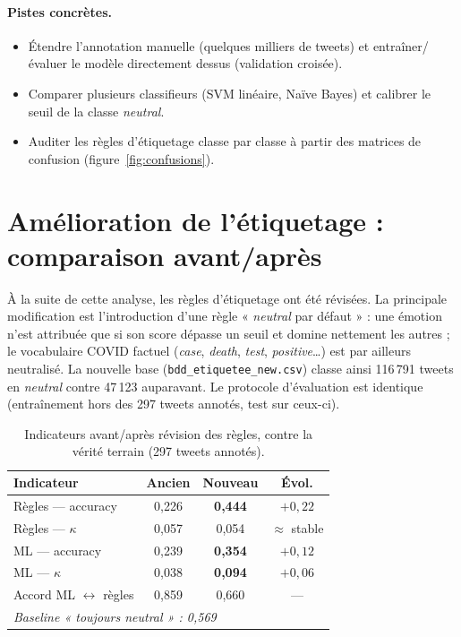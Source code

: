 \documentclass[11pt,a4paper]{article}
\begin{document}
\paragraph{Pistes concrètes.}
\begin{itemize}
  \item Étendre l'annotation manuelle (quelques milliers de tweets) et
        entraîner/évaluer le modèle directement dessus (validation croisée).
  \item Comparer plusieurs classifieurs (SVM linéaire, Naïve Bayes) et calibrer
        le seuil de la classe \emph{neutral}.
  \item Auditer les règles d'étiquetage classe par classe à partir des matrices
        de confusion (figure~\ref{fig:confusions}).
\end{itemize}

\section{Amélioration de l'étiquetage : comparaison avant/après}
\label{sec:amelioration}

À la suite de cette analyse, les règles d'étiquetage ont été révisées. La
principale modification est l'introduction d'une règle « \emph{neutral} par
défaut » : une émotion n'est attribuée que si son score dépasse un seuil et
domine nettement les autres ; le vocabulaire COVID factuel (\emph{case},
\emph{death}, \emph{test}, \emph{positive}\ldots) est par ailleurs neutralisé.
La nouvelle base (\texttt{bdd\_etiquetee\_new.csv}) classe ainsi 116\,791 tweets
en \emph{neutral} contre 47\,123 auparavant. Le protocole d'évaluation est
identique (entraînement hors des 297 tweets annotés, test sur ceux-ci).

\begin{table}[H]
  \centering
  \begin{tabular}{lccc}
    \toprule
    \textbf{Indicateur} & \textbf{Ancien} & \textbf{Nouveau} & \textbf{Évol.} \\
    \midrule
    Règles --- accuracy   & 0,226 & \textbf{0,444} & $+0,22$ \\
    Règles --- $\kappa$    & 0,057 & 0,054 & $\approx$ stable \\
    ML --- accuracy        & 0,239 & \textbf{0,354} & $+0,12$ \\
    ML --- $\kappa$        & 0,038 & \textbf{0,094} & $+0,06$ \\
    Accord ML $\leftrightarrow$ règles & 0,859 & 0,660 & --- \\
    \midrule
    \multicolumn{4}{l}{\emph{Baseline « toujours neutral » : 0,569}} \\
    \bottomrule
  \end{tabular}
  \caption{Indicateurs avant/après révision des règles, contre la vérité terrain
  (297 tweets annotés).}
  \label{tab:avant_apres}
\end{table}
\end{document}
